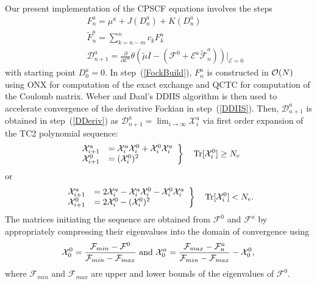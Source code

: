 \documentclass[prl,aps,twocolumn,showpacs,twocolumngrid,superbib]{revtex4}
\begin{document}
Our present implementation of the CPSCF equations involves the steps
\begin{subequations}
\begin{eqnarray}
&&     F^a_{n}=\mu^a+J(D^a_n)+K(D^a_n) \label{FockBuild} \\
&&     \displaystyle\widetilde{F}^a_{n}=\sum_{k=n-m}^{n}c_k F^a_{k} \label{DDIIS} \\
&&     \displaystyle\mathcal{D}^a_{n+1}=\frac{\partial}{\partial \mathcal{E}^a}
     \theta(\tilde{\mu}I-(\mathcal{F}^{0}
     +\mathcal{E}^{a}\widetilde{\mathcal{F}}^{a}_n))
     \bigg|_{\mathcal{E}=0} \label{DDeriv}
   \end{eqnarray} 
\end{subequations}
with starting point $D^a_0=0$. In step~(\ref{FockBuild}),  $F^a_n$ is constructed in ${\cal O}(N)$ 
using ONX \cite{} for computation of the exact exchange and QCTC \cite{} for computation of the Coulomb matrix. 
Weber and Daul's DDIIS algorithm \cite{Weber_2003} is then used to accelerate convergence of the 
derivative Fockian in step~(\ref{DDIIS}).  Then, $\mathcal{D}^a_{n+1}$ is obtained in step~(\ref{DDeriv}) as 
$\mathcal{D}^a_{n+1}=\lim_{i\to\infty}\mathcal{X}^a_{i}$ via first order expansion of the TC2 polynomial sequence:
\begin{equation}
\left.
\begin{array}{ll}
\mathcal{X}^a_{i+1}&=\mathcal{X}^a_{i}\mathcal{X}^0_{i}+\mathcal{X}^0_{i}\mathcal{X}^a_{i}\\
\mathcal{X}^0_{i+1}&=(\mathcal{X}^0_{i})^2
\end{array} 
\right\}\quad {\rm Tr}[\mathcal{X}^0_{i}]\ge N_e 
\end{equation}
or 
\begin{equation}
\left.
\begin{array}{ll}
\mathcal{X}^a_{i+1}&=2\mathcal{X}^a_{i}-\mathcal{X}^a_{i}\mathcal{X}^0_{i}-\mathcal{X}^0_{i}\mathcal{X}^a_{i} \\
\mathcal{X}^0_{i+1}&=2\mathcal{X}^0_{i}-(\mathcal{X}^0_{i})^2
\end{array} 
\right\}\quad {\rm Tr}[\mathcal{X}^0_{i}]< N_e.
\end{equation}
The matrices initiating the sequence are obtained from $\mathcal{F}^0$ and  $\mathcal{F}^a$ by appropriately 
compressing their eigenvalues into the domain of convergence \cite{} using
\begin{equation}
\mathcal{X}^0_{0}=\frac{\mathcal{F}_{min}-\mathcal{F}^0}{\mathcal{F}_{min}-\mathcal{F}_{max}}~{\rm and}~
\mathcal{X}^a_{0}=\frac{\mathcal{F}_{max}-\mathcal{F}^a_{n}}{\mathcal{F}_{min}-\mathcal{F}_{max}}-\mathcal{X}^0_{0},
\end{equation}
where $\mathcal{F}_{min}$ and $\mathcal{F}_{max}$ are upper and lower bounds of the eigenvalues of $\mathcal{F}^0$.
\end{document}
